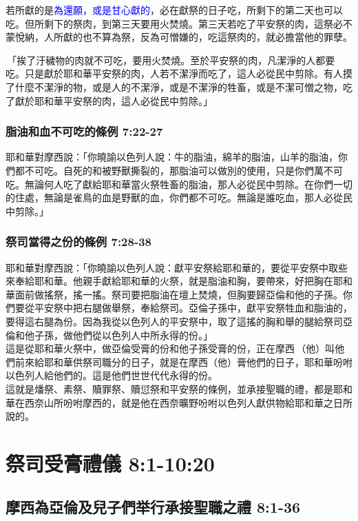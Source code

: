 若所獻的是\textcolor{blue}{為還願，或是甘心獻的}，必在獻祭的日子吃，所剩下的第二天也可以吃。但所剩下的祭肉，到第三天要用火焚燒。第三天若吃了平安祭的肉，這祭必不蒙悅納，人所獻的也不算為祭，反為可憎嫌的，吃這祭肉的，就必擔當他的罪孽。

 「挨了汙穢物的肉就不可吃，要用火焚燒。至於平安祭的肉，凡潔淨的人都要吃。只是獻於耶和華平安祭的肉，人若不潔淨而吃了，這人必從民中剪除。有人摸了什麼不潔淨的物，或是人的不潔淨，或是不潔淨的牲畜，或是不潔可憎之物，吃了獻於耶和華平安祭的肉，這人必從民中剪除。」

\subsubsection{脂油和血不可吃的條例 7:22-27}
耶和華對摩西說：「你曉諭以色列人說：牛的脂油，綿羊的脂油，山羊的脂油，你們都不可吃。自死的和被野獸撕裂的，那脂油可以做別的使用，只是你們萬不可吃。無論何人吃了獻給耶和華當火祭牲畜的脂油，那人必從民中剪除。在你們一切的住處，無論是雀鳥的血是野獸的血，你們都不可吃。無論是誰吃血，那人必從民中剪除。」

\subsubsection{祭司當得之份的條例 7:28-38}
耶和華對摩西說：「你曉諭以色列人說：獻平安祭給耶和華的，要從平安祭中取些來奉給耶和華。他親手獻給耶和華的火祭，就是脂油和胸，要帶來，好把胸在耶和華面前做搖祭，搖一搖。祭司要把脂油在壇上焚燒，但胸要歸亞倫和他的子孫。你們要從平安祭中把右腿做舉祭，奉給祭司。亞倫子孫中，獻平安祭牲血和脂油的，要得這右腿為份。因為我從以色列人的平安祭中，取了這搖的胸和舉的腿給祭司亞倫和他子孫，做他們從以色列人中所永得的份。」\\
這是從耶和華火祭中，做亞倫受膏的份和他子孫受膏的份，正在摩西 （他）叫他們前來給耶和華供祭司職分的日子，就是在摩西（他）膏他們的日子，耶和華吩咐以色列人給他們的。這是他們世世代代永得的份。\\
這就是燔祭、素祭、贖罪祭、贖愆祭和平安祭的條例，並承接聖職的禮，都是耶和華在西奈山所吩咐摩西的，就是他在西奈曠野吩咐以色列人獻供物給耶和華之日所說的。

\section{祭司受膏禮儀 8:1-10:20}
\subsection{摩西為亞倫及兒子們举行承接聖職之禮 8:1-36}

